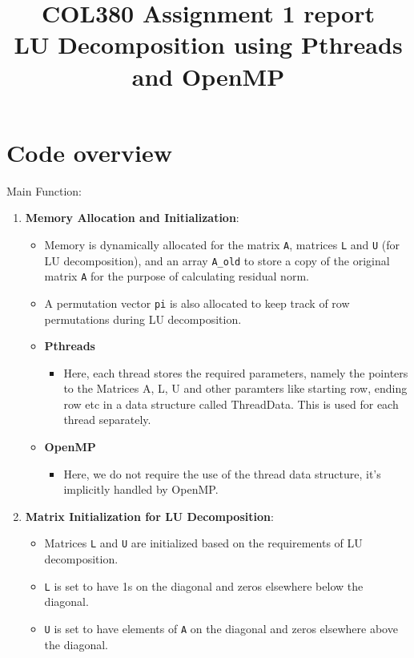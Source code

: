 \documentclass{article}
\title{COL380 Assignment 1 report \\  LU Decomposition using Pthreads and OpenMP}
\author{}
\date{}
\begin{document}
\maketitle

\section{Code overview}

Main Function:

\begin{enumerate}
    \item \textbf{Memory Allocation and Initialization}:
    \begin{itemize}
        \item Memory is dynamically allocated for the matrix \texttt{A}, matrices \texttt{L} and \texttt{U} (for LU decomposition), and an array \texttt{A\_old} to store a copy of the original matrix \texttt{A} for the purpose of calculating residual norm.
        \item A permutation vector \texttt{pi} is also allocated to keep track of row permutations during LU decomposition.
		\item \textbf{Pthreads}
		\begin{itemize}
			\item Here, each thread stores the required parameters, namely the pointers to the Matrices A, L, U and other paramters like starting row, ending row etc in a data structure called ThreadData. This is used for each thread separately.
		\end{itemize}
		\item \textbf{OpenMP}
		\begin{itemize}
			\item Here, we do not require the use of the thread data structure, it's implicitly handled by OpenMP.
		\end{itemize}
    \end{itemize}

    \item \textbf{Matrix Initialization for LU Decomposition}:
    \begin{itemize}
        \item Matrices \texttt{L} and \texttt{U} are initialized based on the requirements of LU decomposition.
        \item \texttt{L} is set to have 1s on the diagonal and zeros elsewhere below the diagonal.
        \item \texttt{U} is set to have elements of \texttt{A} on the diagonal and zeros elsewhere above the diagonal.
    \end{itemize}


\end{enumerate}
\end{document}
